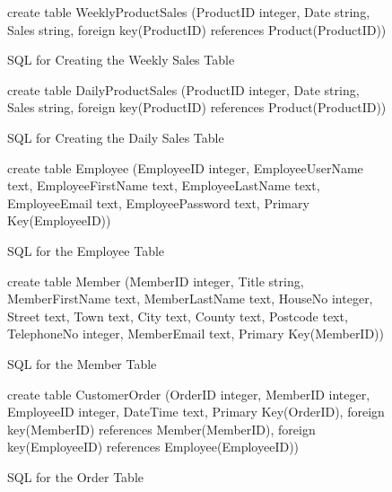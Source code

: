 \begin{figure}[H]
	 \caption{SQL for Creating the Weekly Sales Table} \label{fig:weekly-sql}
	\begin{sql}
	create table WeeklyProductSales
          (ProductID integer,
          Date string,
          Sales string,
          foreign key(ProductID) references Product(ProductID))
	\end{sql}
\end{figure}

\begin{figure}[H]
	 \caption{SQL for Creating the Daily Sales Table} \label{fig:daily-sql}
	\begin{sql}
	create table DailyProductSales
          (ProductID integer,
          Date string,
          Sales string,
          foreign key(ProductID) references Product(ProductID))
	\end{sql}
\end{figure}

\begin{figure}[H]
	 \caption{SQL for the Employee Table} \label{fig:employee-sql}
	\begin{sql}
	create table Employee
              (EmployeeID integer,
              EmployeeUserName text,
              EmployeeFirstName text,
              EmployeeLastName text,
              EmployeeEmail text,
              EmployeePassword text,
              Primary Key(EmployeeID))
	\end{sql}
\end{figure}

\begin{figure}[H]
	 \caption{SQL for the Member Table} \label{fig:member-sql}
	\begin{sql}
	create table Member
              (MemberID integer,
              Title string,
              MemberFirstName text,
              MemberLastName text,
              HouseNo integer,
              Street text,
              Town text,
              City text,
              County text,
              Postcode text,
              TelephoneNo integer,
              MemberEmail text,
              Primary Key(MemberID))
	\end{sql}
\end{figure}

\begin{figure}[H]
	 \caption{SQL for the Order Table} \label{fig:order-sql}
	\begin{sql}
	create table CustomerOrder
            (OrderID integer,
            MemberID integer,
            EmployeeID integer,
            DateTime text,
            Primary Key(OrderID),
            foreign key(MemberID) references Member(MemberID),
            foreign key(EmployeeID) references Employee(EmployeeID))
	\end{sql}
\end{figure}

